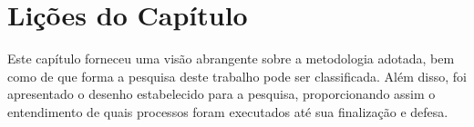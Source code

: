 \section{Lições do Capítulo} \label{sec:licMetodo}

Este capítulo forneceu uma visão abrangente sobre a metodologia adotada, bem como de que forma a pesquisa deste trabalho pode ser classificada. 
Além disso, foi apresentado o desenho estabelecido para a pesquisa, proporcionando assim o entendimento de quais processos foram executados até sua finalização e defesa. 
